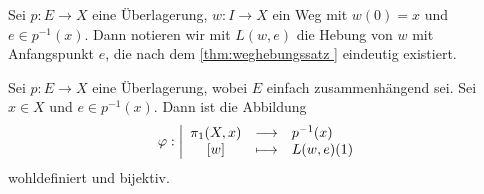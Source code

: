 
\begin{notation*}
    Sei $p\colon  E \to  X$ eine Überlagerung, $w\colon  I \to  X$ ein Weg mit $w(0) = x$ und  $e\in p^{-1} (x)$. Dann notieren wir mit $L(w,e)$ die Hebung von  $w$ mit Anfangspunkt  $e$, die nach dem \autoref{thm:weghebungssatz } eindeutig existiert.
\end{notation*}

\begin{theorem}\label{thm:fundamentalgruppe-durch-überlagerung-mit-einfach-zusammenhängendem-raum}
    Sei $p\colon  E \to  X$ eine Überlagerung, wobei $E$ einfach zusammenhängend sei. Sei $x\in X$ und $e\in p^{-1} (x)$. Dann ist die Abbildung
        \begin{equation*}
        \varphi : \left| \begin{array}{c c l} 
            \pi_1(X,x) & \longrightarrow & p^{-1} (x) \\
            \left[w\right] & \longmapsto &  L(w,e)(1)
        \end{array} \right.
    \end{equation*}
    wohldefiniert und bijektiv.
\end{theorem}

